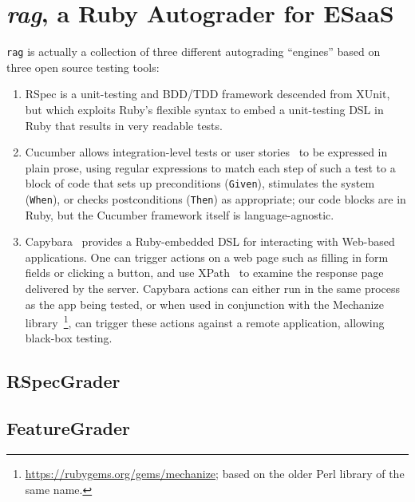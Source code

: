 \section{\emph{rag}, a Ruby Autograder for ESaaS}

\texttt{rag} is actually a collection of three different autograding
``engines'' based on three open source testing
tools:
\begin{enumerate}

\item RSpec is a unit-testing and
BDD/TDD framework descended from XUnit, but which exploits Ruby's
flexible syntax to embed a unit-testing DSL in Ruby that results in very
readable tests.  

\item Cucumber allows
integration-level tests or user stories~\cite{user-stories} to be
expressed in plain prose, using regular expressions to match each step
of such a test to a block of code that sets up preconditions (\texttt{Given}), stimulates
the system (\texttt{When}), or checks postconditions (\texttt{Then}) as
appropriate; our code blocks are in Ruby, but the Cucumber framework
itself is language-agnostic.  

\item Capybara~
provides a Ruby-embedded DSL for interacting with Web-based
applications.
One can trigger actions on a web page such as filling in form fields
or clicking a button, and use XPath~\cite{xpath} to examine the
response page delivered by the server.
Capybara actions can either run in the same process as the app being
tested, or when used in conjunction with the Mechanize
library~\footnote{\url{https://rubygems.org/gems/mechanize}; based on
  the older Perl library of the same name.}, can trigger these actions
against a remote application, allowing black-box testing.

\end{enumerate}

\subsection{RSpecGrader}


\subsection{FeatureGrader}

